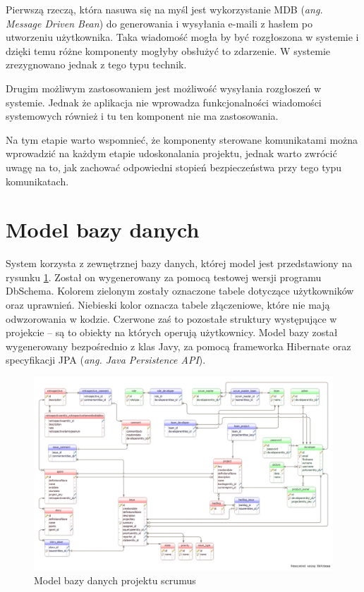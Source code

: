 Pierwszą rzeczą, która nasuwa się na myśl jest wykorzystanie MDB (\textit{ang. Message Driven Bean}) do generowania i wysyłania e-maili z hasłem po utworzeniu użytkownika. Taka wiadomość mogła by być rozgłoszona w systemie i dzięki temu różne komponenty mogłyby obsłużyć to zdarzenie. W systemie zrezygnowano jednak z tego typu technik.

Drugim możliwym zastosowaniem jest możliwość wysyłania rozgłoszeń w systemie. Jednak że aplikacja nie wprowadza funkcjonalności wiadomości systemowych również i tu ten komponent nie ma zastosowania.

Na tym etapie warto wspomnieć, że komponenty sterowane komunikatami można wprowadzić na każdym etapie udoskonalania projektu, jednak warto zwrócić uwagę na to, jak zachować odpowiedni stopień bezpieczeństwa przy tego typu komunikatach.

\section{Model bazy danych}
System korzysta z zewnętrznej bazy danych, której model jest przedstawiony na rysunku \ref{fig:modeldb}. Został on wygenerowany za pomocą testowej wersji programu DbSchema. Kolorem zielonym zostały oznaczone tabele dotyczące użytkowników oraz uprawnień. Niebieski kolor oznacza tabele złączeniowe, które nie mają odwzorowania w kodzie. Czerwone zaś to pozostałe struktury występujące w projekcie -- są to obiekty na których operują użytkownicy. Model bazy został wygenerowany bezpośrednio z klas Javy, za pomocą frameworka Hibernate oraz specyfikacji JPA (\textit{ang. Java Persistence API}).

\begin{figure}
	\centering
	\includegraphics[width=25cm]{rysunki/modeldb.png}	
	\caption{Model bazy danych projektu scrumus}
	\label{fig:modeldb}
\end{figure}

